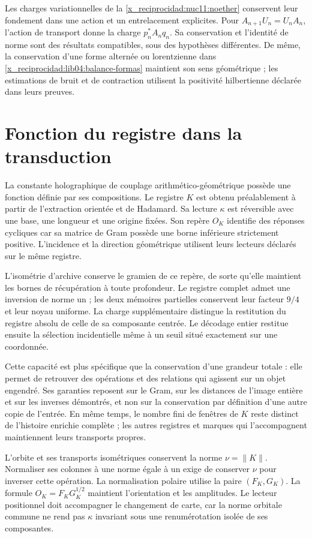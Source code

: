 Les charges variationnelles de la \cref{x_reciprocidad:nuc11:noether} conservent leur
fondement dans une action et un entrelacement explicites. Pour
\(A_{n+1}U_n=U_nA_n\), l’action de transport donne la charge
\(p_n^*A_nq_n\). Sa conservation et l’identité de norme sont des
résultats compatibles, sous des hypothèses différentes. De même,
la conservation d’une forme alternée ou lorentzienne dans
\eqref{x_reciprocidad:lib04:balance-formas} maintient son sens géométrique ;
les estimations de bruit et de contraction utilisent la positivité
hilbertienne déclarée dans leurs preuves.

\section{Fonction du registre dans la transduction}
\label{x_reciprocidad:lib06:registro}

La constante holographique de couplage arithmético-géométrique possède une fonction définie par ses compositions. Le registre \(K\) est obtenu préalablement à partir de l'extraction orientée et de Hadamard. Sa lecture \(\kappa\) est réversible avec une base, une longueur et une origine fixées. Son repère \(O_K\) identifie des réponses cycliques car sa matrice de Gram possède une borne inférieure strictement positive. L'incidence et la direction géométrique utilisent leurs lecteurs déclarés sur le même registre.

L’isométrie d’archive conserve le gramien de ce repère, de sorte qu’elle
maintient les bornes de récupération à toute profondeur. Le
registre complet admet une inversion de norme un ; les deux mémoires
partielles conservent leur facteur \(9/4\) et leur noyau uniforme. La
charge supplémentaire distingue la restitution du registre absolu de
celle de sa composante centrée. Le décodage entier restitue
ensuite la sélection incidentielle même à un seuil situé
exactement sur une coordonnée.

Cette capacité est plus spécifique que la conservation d’une grandeur totale :
elle permet de retrouver des opérations et des relations qui agissent sur un
objet engendré. Ses garanties reposent sur le Gram, sur les
distances de l’image entière et sur les inverses démontrés, et non
sur la conservation par définition d’une autre copie de l’entrée. En même temps,
le nombre fini de fenêtres de \(K\) reste distinct de
l’histoire enrichie complète ; les autres registres et marques
qui l’accompagnent maintiennent leurs transports propres.

L'orbite et ses transports isométriques conservent la norme \(\nu=\|K\|\). Normaliser ses colonnes à une norme égale à un exige de conserver \(\nu\) pour inverser cette opération. La normalisation polaire utilise la paire \((F_K,G_K)\). La formule \(O_K=F_KG_K^{1/2}\) maintient l'orientation et les amplitudes. Le lecteur positionnel doit accompagner le changement de carte, car la norme orbitale commune ne rend pas \(\kappa\) invariant sous une renumérotation isolée de ses composantes.

